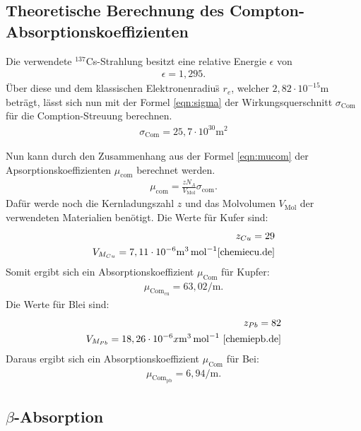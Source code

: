 \subsection{Theoretische Berechnung des Compton-Absorptionskoeffizienten}
Die verwendete $^{137}$Cs-Strahlung besitzt eine relative Energie $\epsilon$ von
\begin{align*}
  \epsilon=1,295.
\end{align*}
Über diese und dem \"klassischen Elektronenradius\" $r_e$, welcher $2,82\cdot10^{-15}\si{\meter}$
beträgt, lässt sich nun mit der Formel \eqref{eqn:sigma}
der Wirkungsquerschnitt $\sigma_\mathrm{Com}$ für die Comption-Streuung
berechnen.
\begin{align*}
\sigma_\mathrm{Com}=25,7\cdot10^{30}\si{\meter\tothe{2}}
\end{align*}

Nun kann durch den Zusammenhang aus der Formel \eqref{eqn:mucom} der
Apsorptionskoeffizienten $\mu_\mathrm{com}$ berechnet werden.
\begin{align}
\mu_\mathrm{com}=\frac{zN_A}{V_\mathrm{Mol}}\sigma_\mathrm{com}.\label{eqn:mucom}
\end{align}
Dafür werde noch die
Kernladungszahl $z$ und das Molvolumen $V_\mathrm{Mol}$ der
verwendeten Materialien  benötigt.
Die Werte für Kufer sind:
\begin{align*}
z_{Cu}=29\\
V_{M_{Cu}}=7,11 \cdot 10^{-6}\si{\meter\tothe{3}\per\mol} \text{\cite{chemiecu.de}}
\end{align*}
Somit ergibt sich ein Absorptionskoeffizient $\mu_\mathrm{Com}$ für Kupfer:
\begin{align*}
  \mu_\mathrm{Com_{cu}}={63,02\si{\per\meter}}.
\end{align*}
Die Werte für Blei sind:
\begin{align*}
z_{Pb}=82\\
V_{M_{Pb}}=18,26 \cdot 10^{-6}x\si{\meter\tothe{3}\per\mol} \text{ \cite{chemiepb.de}}
\end{align*}
Daraus ergibt sich ein Absorptionskoeffizient $\mu_\mathrm{Com}$ für Bei:
\begin{align*}
  \mu_\mathrm{Com_{pb}}={6,94\si{\per\meter}}.
\end{align*}

\subsection{ $β$-Absorption}

